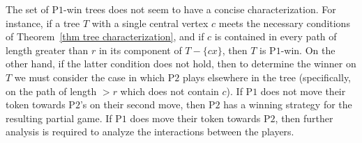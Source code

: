 \documentclass{article}
\theoremstyle{plain}
\theoremstyle{definition}
\def\pone{{\rm{P}\ensuremath{1}}}
\def\ptwo{{\rm{P}\ensuremath{2}}}
\def\ptwoposs{{\rm{P}\ensuremath{2}'s}}
\begin{document}
The set of \pone{}-win trees does not seem to have a concise characterization. 
For instance, if a tree $T$ with a single central vertex $c$ meets the necessary conditions of Theorem~\ref{thm tree characterization}, and if $c$ is contained in every path of length greater than $r$ in its component of $T - \{cx\}$, then $T$ is \pone{}-win.
On the other hand, if the latter condition does not hold, then
to determine the winner on $T$ we must consider the case in which \ptwo{} plays elsewhere in the tree (specifically, on the path of length $>r$ which does not contain $c$).
If \pone{} does not move their token towards \ptwoposs{} on their second move, then \ptwo{} has a winning strategy for the resulting partial game. 
If \pone{} does move their token towards \ptwo{}, then further analysis is required to analyze the interactions between the players. 
\end{document}
